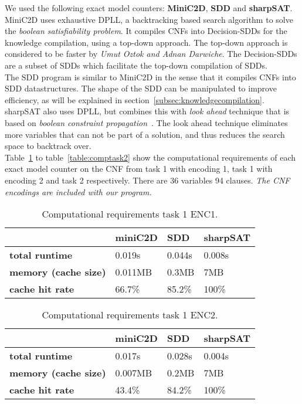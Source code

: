 We used the following exact model counters: \textbf{MiniC2D}, \textbf{SDD} and \textbf{sharpSAT}.
\\[2ex]
MiniC2D uses exhaustive DPLL, a backtracking based search algorithm to solve the \textit{boolean satisfiability problem}. It compiles CNFs into Decision-SDDs for the knowledge compilation, using a top-down approach. The top-down approach is considered to be faster by \textit{Umut Oztok and Adnan Darwiche}\cite{oztok2015top}. The Decision-SDDs are a subset of SDDs which facilitate the top-down compilation of SDDs.
\\[2ex]
The SDD program is similar to MiniC2D in the sense that it compiles CNFs into SDD datastructures. The shape of the SDD can be manipulated to improve efficiency, as will be explained in section~\ref{subsec:knowledgecompilation}.
\\[2ex]
sharpSAT also uses DPLL, but combines this with \textit{look ahead} technique that is based on \textit{boolean constraint propagation}~\cite{thurley2006sharpsat}. The look ahead technique eliminates more variables that can not be part of a solution, and thus reduces the search space to backtrack over.
\\[2ex]
Table~\ref{table:comptask1enc1} to table~\ref{table:comptask2} show the computational requirements of each exact model counter on the CNF from task 1 with encoding 1, task 1 with encoding 2 and task 2 respectively. There are 36 variables 94 clauses. \textit{The CNF encodings are included with our program.}


\begin{table}[h]
	\centering
	\caption{Computational requirements task 1 ENC1.}
	\label{table:comptask1enc1}
	\begin{tabular}{l|l|l|l}
		\textbf{}        & \textbf{miniC2D} & \textbf{SDD} & \textbf{sharpSAT} \\ \hline
		\textbf{total runtime} &  0.019s  &   0.044s   &   0.008s  \\ \hline
		\textbf{memory (cache size)}  &  0.011MB  &   0.3MB &   7MB  \\ \hline
		\textbf{cache hit rate}  & 66.7\%  & 85.2\% &   100\%
	\end{tabular}
\end{table}

\begin{table}[h]
	\centering
	\caption{Computational requirements task 1 ENC2.}
	\label{table:comptask1enc2}
	\begin{tabular}{l|l|l|l}
		\textbf{}        & \textbf{miniC2D} & \textbf{SDD} & \textbf{sharpSAT} \\ \hline
		\textbf{total runtime} &  0.017s  &   0.028s   &   0.004s  \\ \hline
		\textbf{memory (cache size)}  &  0.007MB  &   0.2MB &   7MB  \\ \hline
		\textbf{cache hit rate}  & 43.4\%  & 84.2\% &   100\%
	\end{tabular}
\end{table}

